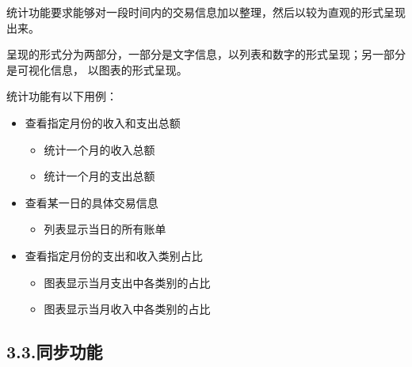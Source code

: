\documentclass{article}
\begin{document}
\noindent{}统计功能要求能够对一段时间内的交易信息加以整理，然后以较为直观的形式呈现出来。%

呈现的形式分为两部分，一部分是文字信息，以列表和数字的形式呈现；另一部分是可视化信息，
以图表的形式呈现。%

统计功能有以下用例：%

\begin{itemize}[noitemsep,topsep=\mdcompacttopsep]%

\item{}查看指定月份的收入和支出总额

\begin{itemize}[noitemsep,topsep=\mdcompacttopsep]%

\item{}统计一个月的收入总额%

\item{}统计一个月的支出总额%
\end{itemize}%

\item{}查看某一日的具体交易信息

\begin{itemize}[noitemsep,topsep=\mdcompacttopsep]%

\item{}列表显示当日的所有账单%
\end{itemize}%

\item{}查看指定月份的支出和收入类别占比

\begin{itemize}[noitemsep,topsep=\mdcompacttopsep]%

\item{}图表显示当月支出中各类别的占比%

\item{}图表显示当月收入中各类别的占比%
\end{itemize}%
\end{itemize}%

\subsection{3.3.\hspace*{0.5em}同步功能}\label{section}%
\end{document}
